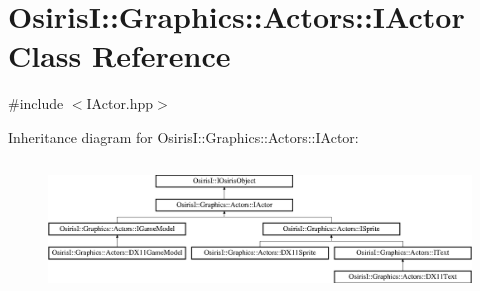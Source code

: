 \hypertarget{class_osiris_i_1_1_graphics_1_1_actors_1_1_i_actor}{\section{Osiris\-I\-:\-:Graphics\-:\-:Actors\-:\-:I\-Actor Class Reference}
\label{class_osiris_i_1_1_graphics_1_1_actors_1_1_i_actor}
}


{\ttfamily \#include $<$I\-Actor.\-hpp$>$}

Inheritance diagram for Osiris\-I\-:\-:Graphics\-:\-:Actors\-:\-:I\-Actor\-:\begin{figure}[H]
\begin{center}
\leavevmode
\includegraphics[height=3.575990cm]{class_osiris_i_1_1_graphics_1_1_actors_1_1_i_actor}
\end{center}
\end{figure}
